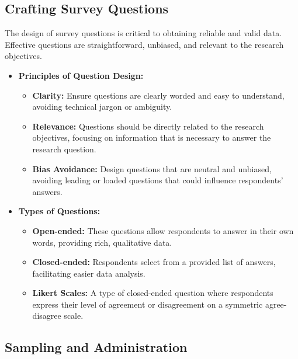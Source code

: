 \documentclass[
]{book}
\providecommand{\tightlist}{%
  \setlength{\itemsep}{0pt}\setlength{\parskip}{0pt}}
\begin{document}
\hypertarget{crafting-survey-questions}{%
\subsection*{Crafting Survey Questions}\label{crafting-survey-questions}}

The design of survey questions is critical to obtaining reliable and valid data. Effective questions are straightforward, unbiased, and relevant to the research objectives.

\begin{itemize}
\tightlist
\item
  \textbf{Principles of Question Design:}

  \begin{itemize}
  \tightlist
  \item
    \textbf{Clarity:} Ensure questions are clearly worded and easy to understand, avoiding technical jargon or ambiguity.
  \item
    \textbf{Relevance:} Questions should be directly related to the research objectives, focusing on information that is necessary to answer the research question.
  \item
    \textbf{Bias Avoidance:} Design questions that are neutral and unbiased, avoiding leading or loaded questions that could influence respondents' answers.
  \end{itemize}
\item
  \textbf{Types of Questions:}

  \begin{itemize}
  \tightlist
  \item
    \textbf{Open-ended:} These questions allow respondents to answer in their own words, providing rich, qualitative data.
  \item
    \textbf{Closed-ended:} Respondents select from a provided list of answers, facilitating easier data analysis.
  \item
    \textbf{Likert Scales:} A type of closed-ended question where respondents express their level of agreement or disagreement on a symmetric agree-disagree scale.
  \end{itemize}
\end{itemize}

\hypertarget{sampling-and-administration}{%
\subsection*{Sampling and Administration}\label{sampling-and-administration}}
\end{document}
